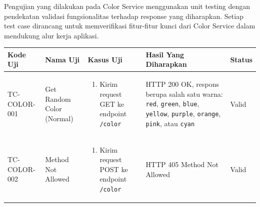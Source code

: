 Pengujian yang dilakukan pada Color Service menggunakan unit testing dengan
pendekatan validasi fungsionalitas terhadap response yang diharapkan. Setiap
test case dirancang untuk memverifikasi fitur-fitur kunci dari Color Service
dalam mendukung alur kerja aplikasi.
\begin{table}[H]
  \centering
  \small
  \begin{adjustbox}{width=\textwidth}
    \begin{tabular}{|p{1.5cm}|p{3.2cm}|p{5cm}|p{3.2cm}|p{1.2cm}|}
      \hline
      \textbf{Kode Uji}                                                                                                                                                               & \textbf{Nama Uji}         & \textbf{Kasus Uji} & \textbf{Hasil Yang Diharapkan} & \textbf{Status} \\
      \hline
      TC-COLOR-001                                                                                                                                                                    & Get Random Color (Normal) &
      \begin{enumerate}[leftmargin=*,noitemsep,topsep=0pt,label=\arabic*.,widest=99]
        \item Kirim request GET ke endpoint \texttt{/color}
      \end{enumerate}                                                                                                                &
      HTTP 200 OK, respons berupa salah satu warna: \texttt{red}, \texttt{green}, \texttt{blue}, \texttt{yellow}, \texttt{purple}, \texttt{orange}, \texttt{pink}, atau \texttt{cyan} & Valid                                                                                             \\ \hline

      TC-COLOR-002                                                                                                                                                                    & Method Not Allowed        &
      \begin{enumerate}[leftmargin=*,noitemsep,topsep=0pt,label=\arabic*.,widest=99]
        \item Kirim request POST ke endpoint \texttt{/color}
      \end{enumerate}                                                                                                                &
      HTTP 405 Method Not Allowed                                                                                                                                                     & Valid                                                                                             \\ \hline


\end{tabular}
\end{adjustbox}
\end{table}

